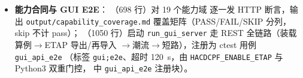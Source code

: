 \begin{itemize}
        （不再转致密矩阵，仅用于校核），被
         以 $<10^{-6}$ 门槛复算
        每个收敛解（PV--PQ 切换或多岛算例因指定量不同显式跳过复算，:run\_case）；
  \item \textbf{能力合同与 GUI E2E}：
        （698 行）对 19 个能力域
        逐一发 HTTP 断言，输出 \texttt{output/capability\_coverage.md}
        覆盖矩阵（PASS/FAIL/SKIP 分列，skip 不计 pass）；
        （1050 行）启动
        \texttt{run\_gui\_server} 走 REST 全链路（装载算例$\to$ETAP 导出/再导入
        $\to$潮流$\to$短路），注册为 ctest 用例 \texttt{gui\_api\_e2e}
        （标签 \texttt{gui;e2e}、超时 120~s，由 \texttt{HACDCPF\_ENABLE\_ETAP}
        与 Python3 双重门控， 中
        \texttt{gui\_api\_e2e} 注册块）。
\end{itemize}

